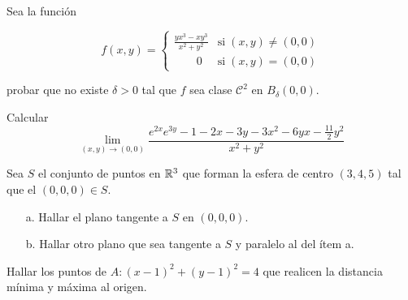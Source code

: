 
\begin{question}
    Sea la función

    \[
        f(x,y) =
        \begin{cases}
            \displaystyle \frac{yx^3-xy^3}{x^2+y^2} & \text{si}\; (x,y) \neq (0,0) \\[10pt]
            \qquad 0                                & \text{si}\; (x,y)=(0,0)
        \end{cases}
    \]

    probar que no existe $\delta>0$ tal que $f$ sea clase $\mathcal{C}^2$ en $B_{\delta}(0,0)$.
\end{question}


\begin{question} Calcular
    \[
        \lim_{(x,y) \to (0,0)}
        \frac{e^{2x}e^{3y} - 1 - 2x -3y - 3x^2 - 6yx - \frac{11}{2}y^2}{x^2+y^2}
    \]
\end{question}


\begin{question}
    Sea $S$ el conjunto de puntos en  $\mathbb{R}^3$  que forman la esfera de centro $(3,4,5)$ tal que el $(0,0,0) \in S$.
    \begin{itemize}
        \item [a.] Hallar el plano tangente a $S$ en $(0,0,0)$.
        \item [b.] Hallar otro plano que sea tangente a $S$ y paralelo al del ítem a.
    \end{itemize}
\end{question}


\begin{question}
    Hallar los puntos de $A:(x-1)^2 + (y-1)^2 = 4$ que realicen la distancia mínima y máxima al origen.
\end{question}

\newpage

